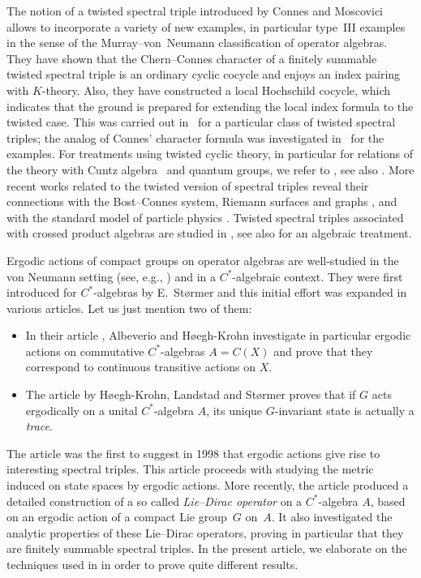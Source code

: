 \documentclass[pdftex]{sigma}
\numberwithin{equation}{section}
\begin{document}
The notion of a twisted spectral triple introduced by Connes and Moscovici~\cite{TrSpTypeIII} allows to incorporate a variety
of new examples, in particular type~III examples in the sense of the Murray--von~Neumann classif\/ication of operator algebras. They have shown that the Chern--Connes
character of a f\/initely summable twisted spectral triple is an ordinary cyclic cocycle
and enjoys an index pairing with $K$-theory. Also, they have constructed
a local Hochschild cocycle, which indicates that the ground is prepared for
extending the local index formula to the twisted case. This was carried out
in~\cite{TwsitedMos} for a particular class of twisted spectral triples; the analog
of Connes' character formula was investigated in~\cite{TwistedFatKha} for the
examples.
For treatments using twisted cyclic theory, in particular for relations
of the theory with Cuntz algebra~\cite{CuntzAlg} and quantum groups,
we refer to \cite{KMSCarNeshNes, TwistedCarPhiRen, CuntzAlgCarPhiRen},
see also \cite{ModularKaad, TwistedSU2KaaSen}. More recent works related
to the twisted version of spectral triples reveal their connections with the Bost--Connes
system, Riemann surfaces and graphs \cite{TwistedGreMarTeh}, and with the
standard model of particle physics \cite{TwistedDevMar}. Twisted spectral triples
associated with crossed product algebras are studied in \cite{TrSpTypeIII, TwistedIochum,TwsitedMos}, see also \cite{FatKhaTwistedSymbols} for an algebraic treatment.


Ergodic actions of compact groups on operator algebras are well-studied in the von Neumann setting (see, e.g., \cite{ErgodActIWassermann,ErgodActIIWassermann,ErgodClassSU2Wassermann}) and in a $C^*$-algebraic context. They were f\/irst introduced for $C^*$-algebras by E.~St\o{}rmer \cite{SpectraErgodTransfStormer} and this initial ef\/fort was expanded in various articles. Let us just mention two of them:
\begin{itemize}\itemsep=0pt
\item
In their article \cite{ErgodActAHK}, Albeverio and H\o{}egh-Krohn investigate in particular ergodic actions on commutative $C^*$-algebras $A = C(X)$ and prove that they correspond to continuous transitive actions on $X$.
\item
The article \cite{ErgodCpctGpHKLS} by H\o{}egh-Krohn, Landstad and St\o{}rmer proves that if $G$ acts ergodically on a unital $C^*$-algebra $A$, its unique $G$-invariant state is actually a \emph{trace}.
\end{itemize}
The article \cite{Rieffel98} was the f\/irst to suggest in 1998 that ergodic actions give rise to interesting spectral triples. This article proceeds with studying the metric induced on state spaces by ergodic actions. More recently, the article \cite{TrSpLieGpGG} produced a detailed construction of a so called \emph{Lie--Dirac operator} on a $C^*$-algebra $A$, based on an ergodic action of a compact Lie group~$G$ on~$A$. It also investigated the analytic properties of these Lie--Dirac operators, proving in particular that they are f\/initely summable spectral triples. In the present article, we elaborate on the techniques used in \cite{TrSpLieGpGG} in order to prove quite dif\/ferent results.
\end{document}
